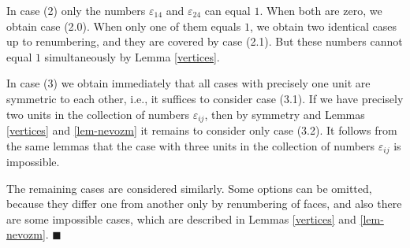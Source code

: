 \documentclass[14pt]{article}
\newenvironment{proof}                    
       {\par\indent{\bf Proof. }} 
	        {\hfill $\scriptstyle\blacksquare$}
\begin{document}
\begin{proof}
In case (2) only the numbers $\varepsilon_{14}$ and
$\varepsilon_{24}$ can  equal $1$. When both are zero, we obtain case
(2.0).
When only one of them equals $1$, we obtain two
identical cases up to renumbering, and they are covered by case (2.1).
But these numbers cannot  equal $1$ simultaneously by  Lemma \ref{vertices}.

In case (3) we  obtain immediately that all cases with precisely one unit
are symmetric to each other, i.e., it suffices to consider case (3.1).
If we have precisely two units in the collection of numbers $\varepsilon_{ij}$, then by symmetry and Lemmas
\ref{vertices} and \ref{lem-nevozm} it remains to consider only case (3.2).
It follows from the same lemmas that the case with three units in the collection of numbers
$\varepsilon_{ij}$ is impossible.

The remaining cases are considered similarly. Some options can be
 omitted, because
they differ one from another only by renumbering of faces, and also
there are some impossible cases, which are described in Lemmas \ref{vertices}
and \ref{lem-nevozm}.
\end{proof}
\end{document}

